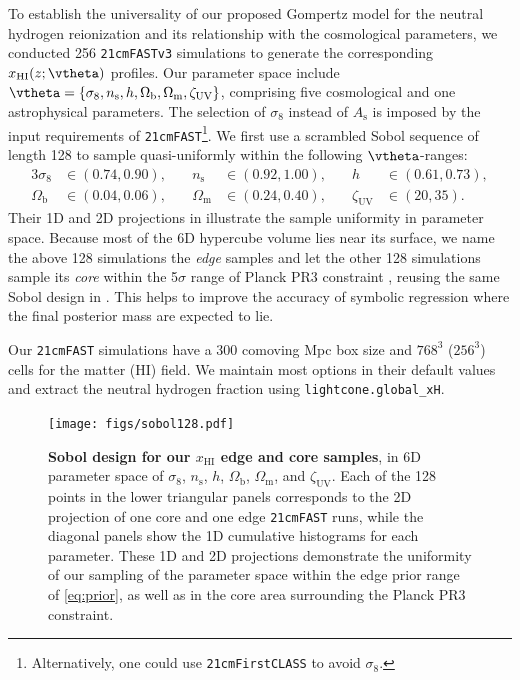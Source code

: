 \documentclass[12pt, a4paper]{article}
\newcommand{\As}{A_\mathrm{s}}
\newcommand{\ns}{n_\mathrm{s}}
\newcommand{\Omegam}{\Omega_\mathrm{m}}
\newcommand{\Omegab}{\Omega_\mathrm{b}}
\newcommand{\zetaUV}{\zeta_\mathrm{UV}}
\newcommand{\HI}{\mathrm{HI}}
\begin{document}
To establish the universality of our proposed Gompertz model for the
neutral hydrogen reionization and its relationship with the cosmological
parameters, we conducted 256 \texttt{21cmFASTv3} simulations to generate
the corresponding $x_\HI(z; \vtheta)$ profiles.
Our parameter space include $\vtheta = \{\sigma_8, \ns, h, \Omegab,
\Omegam, \zetaUV\}$, comprising five cosmological and one astrophysical
parameters.
The selection of $\sigma_8$ instead of $\As$ is imposed by the input
requirements of \texttt{21cmFAST}\footnote{Alternatively, one could use
\texttt{21cmFirstCLASS}\cite{Flitter2024} to avoid $\sigma_8$.}.
We first use a scrambled Sobol sequence \cite{Sobol1967, Owen1998} of
length 128 to sample quasi-uniformly within the following
$\vtheta$-ranges:
%
\begin{alignat}{3}
\label{eq:prior}
\sigma_8 &\in (0.74, 0.90), &\quad
\ns &\in (0.92, 1.00), &\quad
h &\in (0.61, 0.73), \nonumber\\
\Omegab &\in (0.04, 0.06), &\quad
\Omegam &\in (0.24, 0.40), &\quad
\zetaUV &\in (20, 35).
\end{alignat}
%
Their 1D and 2D projections in  illustrate the sample
uniformity in parameter space.
Because most of the 6D hypercube volume lies near its surface, we name
the above 128 simulations the \emph{edge} samples and let the other 128
simulations sample its \emph{core} within the 5$\sigma$ range of Planck
PR3 constraint \cite{Planck2020a}, reusing the same Sobol design in
.
This helps to improve the accuracy of symbolic regression where the
final posterior mass are expected to lie.

Our \texttt{21cmFAST} simulations have a 300 comoving Mpc box size and
$768^3$ ($256^3$) cells for the matter (HI) field.
We maintain most options in their default values and extract the
neutral hydrogen fraction using \texttt{lightcone.global\_xH}.

\begin{figure}[tb]
\centering
\texttt{[image: figs/sobol128.pdf]}
\caption{\textbf{\boldmath Sobol design for our $x_\HI$ edge and core
samples},
in 6D parameter space of $\sigma_8$, $\ns$, $h$, $\Omegab$, $\Omegam$,
and $\zetaUV$.
Each of the 128 points in the lower triangular panels corresponds to the
2D projection of one core and one edge \texttt{21cmFAST} runs, while the
diagonal panels show the 1D cumulative histograms for each parameter.
These 1D and 2D projections demonstrate the uniformity of our sampling
of the parameter space within the edge prior range of \cref{eq:prior},
as well as in the core area surrounding the Planck PR3 constraint.}
\label{fig:sobol}
\end{figure}
\end{document}
